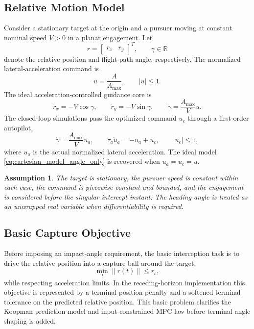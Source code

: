 \documentclass[letterpaper,journal]{IEEEtran}
\newtheorem{assumption}{Assumption}
\begin{document}
\subsection{Relative Motion Model}
Consider a stationary target at the origin and a pursuer moving at constant nominal speed $V>0$ in a planar engagement. Let
\begin{equation}
    r=\begin{bmatrix}r_x&r_y\end{bmatrix}^T,\qquad
    \gamma\in\mathbb R
\end{equation}
denote the relative position and flight-path angle, respectively. The normalized lateral-acceleration command is
\begin{equation}
    u=\frac{A}{A_{\max}},\qquad |u|\le 1 .
\end{equation}
The ideal acceleration-controlled guidance core is
\begin{equation}
    \dot r_x=-V\cos\gamma,\qquad
    \dot r_y=-V\sin\gamma,\qquad
    \dot\gamma=\frac{A_{\max}}{V}u .
    \label{eq:cartesian_model_angle_only}
\end{equation}
The closed-loop simulations pass the optimized command $u_c$ through a first-order autopilot,
\begin{equation}
    \dot\gamma=\frac{A_{\max}}{V}u_a,\qquad
    \tau_a\dot u_a=-u_a+u_c,\qquad |u_c|\le1 ,
    \label{eq:autopilot_angle_only}
\end{equation}
where $u_a$ is the actual normalized lateral acceleration. The ideal model \eqref{eq:cartesian_model_angle_only} is recovered when $u_a=u_c=u$.

\begin{assumption}
The target is stationary, the pursuer speed is constant within each case, the command is piecewise constant and bounded, and the engagement is considered before the singular intercept instant. The heading angle is treated as an unwrapped real variable when differentiability is required.
\end{assumption}

\subsection{Basic Capture Objective}
Before imposing an impact-angle requirement, the basic interception task is to drive the relative position into a capture ball around the target,
\begin{equation}
    \min_t \|r(t)\|\le r_c ,
    \label{eq:basic_capture_objective}
\end{equation}
while respecting acceleration limits. In the receding-horizon implementation this objective is represented by a terminal position penalty and a softened terminal tolerance on the predicted relative position. This basic problem clarifies the Koopman prediction model and input-constrained MPC law before terminal angle shaping is added.
\end{document}
